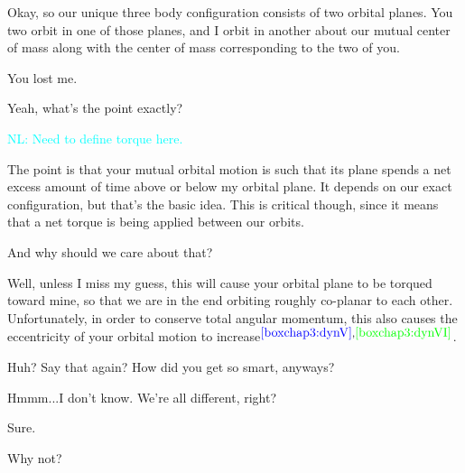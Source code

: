 \documentclass[main.tex]{subfiles}
\begin{document}
\par \Celaeno  Okay, so our unique three body configuration consists of two orbital planes.  You two orbit in one of those planes, and I orbit in another about our mutual center of mass along with the center of mass corresponding to the two of you.

\par \Alcyone  You lost me.

\par \Taygete Yeah, what's the point exactly?

\textcolor{cyan}{NL:  Need to define torque here.}
\par \Celaeno The point is that your mutual orbital motion is such that its plane spends a net excess amount of time above or below my orbital plane.  It depends on our exact configuration, but that's the basic idea.  This is critical though, since it means that a net torque is being applied between our orbits.




\par \Alcyone And why should we care about that?

\par \Celaeno Well, unless I miss my guess, this will cause your orbital plane to be torqued toward mine, so that we are in the end orbiting roughly co-planar to each other.  Unfortunately, in order to conserve total angular momentum, this also causes the eccentricity of your orbital motion to increase$^{\textcolor{blue}{\ref{boxchap3:dynV}},\textcolor{green}{\ref{boxchap3:dynVI}}}$.  

\par \Taygete  Huh?  Say that again?  How did you get so smart, anyways?

\par \Celaeno Hmmm...I don't know.  We're all different, right? 

\par \Alcyone Sure.

\par \Taygete Why not?
\end{document}
